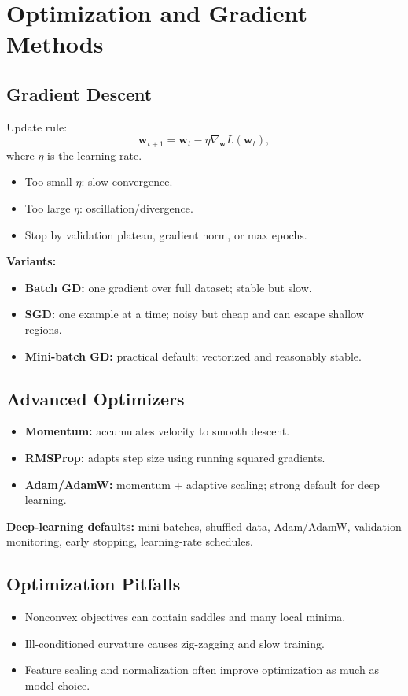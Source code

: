 \documentclass[10pt,twocolumn]{article}
\newcommand{\w}{\mathbf{w}}
\newcommand{\chead}[1]{\vspace{0.15em}\textbf{#1:} }
\begin{document}
\section{Optimization and Gradient Methods}
\subsection{Gradient Descent}
Update rule:
\[
\w_{t+1}=\w_t-\eta\nabla_{\w}L(\w_t),
\]
where $\eta$ is the learning rate.
\begin{itemize}
  \item Too small $\eta$: slow convergence.
  \item Too large $\eta$: oscillation/divergence.
  \item Stop by validation plateau, gradient norm, or max epochs.
\end{itemize}
\chead{Variants}
\begin{itemize}
  \item \textbf{Batch GD:} one gradient over full dataset; stable but slow.
  \item \textbf{SGD:} one example at a time; noisy but cheap and can escape shallow regions.
  \item \textbf{Mini-batch GD:} practical default; vectorized and reasonably stable.
\end{itemize}

\subsection{Advanced Optimizers}
\begin{itemize}
  \item \textbf{Momentum:} accumulates velocity to smooth descent.
  \item \textbf{RMSProp:} adapts step size using running squared gradients.
  \item \textbf{Adam/AdamW:} momentum + adaptive scaling; strong default for deep learning.
\end{itemize}
\chead{Deep-learning defaults} mini-batches, shuffled data, Adam/AdamW, validation monitoring, early stopping, learning-rate schedules.

\subsection{Optimization Pitfalls}
\begin{itemize}
  \item Nonconvex objectives can contain saddles and many local minima.
  \item Ill-conditioned curvature causes zig-zagging and slow training.
  \item Feature scaling and normalization often improve optimization as much as model choice.
\end{itemize}
\end{document}
